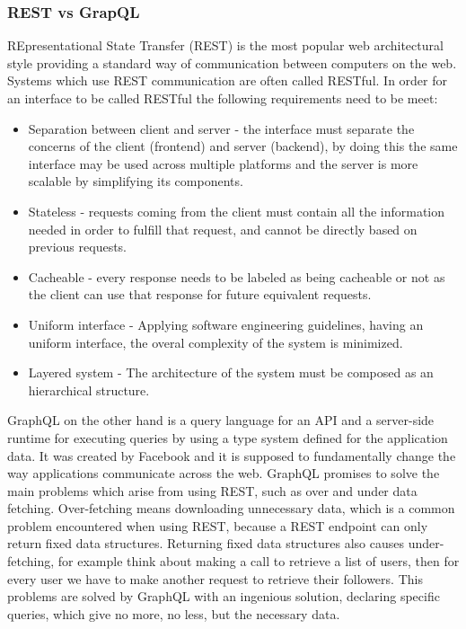 \subsubsection{REST vs GrapQL}
REpresentational State Transfer (REST) \cite{rest} is the most popular web architectural style providing a standard way of communication between computers on the web. Systems which use REST communication are often called RESTful. In order for an interface to be called RESTful the following requirements need to be meet:
\begin{itemize}
    \item Separation between client and server - the interface must separate the concerns of the client (frontend) and server (backend), by doing this the same interface may be used across multiple platforms and the server is more scalable by simplifying its components.
    \item Stateless - requests coming from the client must contain all the information needed in order to fulfill that request, and cannot be directly based on previous requests. 
    \item Cacheable - every response needs to be labeled as being cacheable or not as the client can use that response for future equivalent requests.
    \item Uniform interface - Applying software engineering guidelines, having an uniform interface, the overal complexity of the system is minimized.
    \item Layered system - The architecture of the system must be composed as an hierarchical structure.
\end{itemize}

\par GraphQL\cite{graphQL} on the other hand is a query language for an API and a server-side runtime for executing queries by using a type system defined for the application data. It was created by Facebook and it is supposed to fundamentally change the way applications communicate  across the web. GraphQL promises to solve the main problems which arise from using REST, such as over and under data fetching. Over-fetching means downloading unnecessary data, which is a common problem encountered when using REST, because a REST endpoint can only return fixed data structures. Returning fixed data structures also causes under-fetching, for example think about making a call to retrieve a list of users, then for every user we have to make another request to retrieve their followers. This problems are solved by GraphQL with an ingenious solution, declaring specific queries, which give no more, no less, but the necessary data. 

